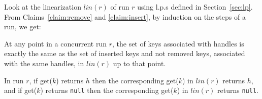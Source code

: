 Look at the linearization $lin(r)$ of run $r$ using l.p.s defined in Section~\ref{sec:lp}.
From Claims~\ref{claim:remove} and \ref{claim:insert}, by induction on the steps of a run, we get:
 
\begin{corollary}
\label{corollary}
At any point in a concurrent run $r$, the set of keys associated with handles is exactly the same as the set of inserted keys and not removed keys, associated with the same handles, in $lin(r)$ up to that point.
\end{corollary}


\begin{claim}[Get]
In run $r$, if get($k$) returns $h$ then the corresponding get($k$) in $lin(r)$ returns $h$, and if get($k$) returns \texttt{null} then the corresponding get($k$) in $lin(r)$ returns \texttt{null}.
\end{claim}

